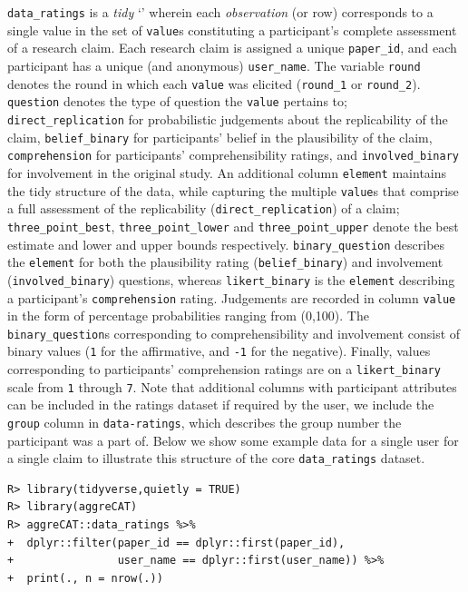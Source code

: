 \documentclass[article]{jss}
\newcommand{\class}[1]{`\code{#1}'}
\begin{document}
\texttt{data\_ratings} is a \emph{tidy} \class{data.frame} wherein each
\emph{observation} (or row) corresponds to a single value in the set of
\texttt{value}s constituting a participant's complete assessment of a
research claim. Each research claim is assigned a unique
\texttt{paper\_id}, and each participant has a unique (and anonymous)
\texttt{user\_name}. The variable \texttt{round} denotes the round in
which each \texttt{value} was elicited (\texttt{round\_1} or
\texttt{round\_2}). \texttt{question} denotes the type of question the
\texttt{value} pertains to; \texttt{direct\_replication} for
probabilistic judgements about the replicability of the claim,
\texttt{belief\_binary} for participants' belief in the plausibility of
the claim, \texttt{comprehension} for participants' comprehensibility
ratings, and \texttt{involved\_binary} for involvement in the original
study. An additional column \texttt{element} maintains the tidy
structure of the data, while capturing the multiple \texttt{value}s that
comprise a full assessment of the replicability
(\texttt{direct\_replication}) of a claim; \texttt{three\_point\_best},
\texttt{three\_point\_lower} and \texttt{three\_point\_upper} denote the
best estimate and lower and upper bounds respectively.
\texttt{binary\_question} describes the \texttt{element} for both the
plausibility rating (\texttt{belief\_binary}) and involvement
(\texttt{involved\_binary}) questions, whereas \texttt{likert\_binary}
is the \texttt{element} describing a participant's
\texttt{comprehension} rating. Judgements are recorded in column
\texttt{value} in the form of percentage probabilities ranging from
(0,100). The \texttt{binary\_question}s corresponding to
comprehensibility and involvement consist of binary values (\texttt{1}
for the affirmative, and \texttt{-1} for the negative). Finally, values
corresponding to participants' comprehension ratings are on a
\texttt{likert\_binary} scale from \texttt{1} through \texttt{7}. Note
that additional columns with participant attributes can be included in
the ratings dataset if required by the user, we include the
\texttt{group} column in \texttt{data-ratings}, which describes the
group number the participant was a part of. Below we show some example
data for a single user for a single claim to illustrate this structure
of the core \texttt{data\_ratings} dataset.

\begin{verbatim}
R> library(tidyverse,quietly = TRUE)
R> library(aggreCAT)
R> aggreCAT::data_ratings %>% 
+  dplyr::filter(paper_id == dplyr::first(paper_id), 
+                user_name == dplyr::first(user_name)) %>% 
+  print(., n = nrow(.))
\end{verbatim}
\end{document}
